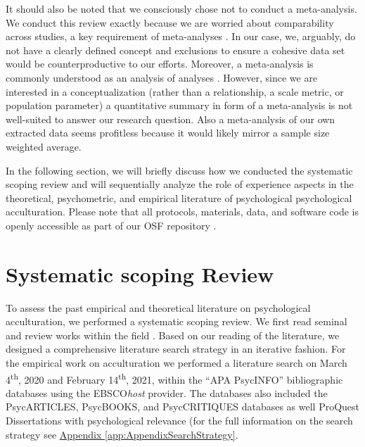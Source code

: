 \documentclass[man, 12pt, a4paper, mask]{apa7}
\providecommand{\DIFaddbegin}{} %
\providecommand{\DIFaddend}{} %
\newcommand{\DIFaddincludegraphics}[2][]{{\color{blue}\fbox{\DIFOincludegraphics[#1]{#2}}}} %
\DeclareRobustCommand{\DIFaddbegin}{\DIFOaddbegin \let\includegraphics\DIFaddincludegraphics} %
\DeclareRobustCommand{\DIFaddend}{\DIFOaddend \let\includegraphics\DIFOincludegraphics} %
\begin{document}
It should also be noted that we consciously chose not to conduct a meta-analysis. We conduct this review exactly because we are worried about comparability across studies, a key requirement of meta-analyses \citep{Pogue1998}. In our case, we, arguably, do not have a clearly defined concept and exclusions to ensure a cohesive data set would be counterproductive to our efforts. Moreover, a meta-analysis is commonly understood as an analysis of analyses \citep{Glass1976}. However, since we are interested in a conceptualization (rather than a relationship, a scale metric, or population parameter) a quantitative summary in form of a meta-analysis is not well-suited to answer our research question. Also a meta-analysis of our own extracted data seems profitless because it would likely mirror a sample size weighted average.

In the following section, we will briefly discuss how we conducted the systematic scoping review and will sequentially analyze the role of experience aspects in the theoretical, psychometric, and empirical literature of psychological psychological acculturation. Please note that all protocols, materials, data, and software code is openly accessible as part of our OSF repository \citep[][]{Kreienkamp2021e}.


\section{Systematic scoping Review}
\newcommand{\nTheo}{92}
\newcommand{\nMeth}{233}
\newcommand{\nEmp}{526}
\DIFaddbegin \newcommand{\nCultureHost}{43}
\newcommand{\nCultureOrigin}{118}
\newcommand{\nCultureCombs}{315}
\DIFaddend 

To assess the past empirical and theoretical literature on psychological
acculturation, we performed a systematic scoping review. We first read
seminal and review works within the field
\citep[including,][]{Ward2019, Berry1997b, Berry2003, Szapocznik1978, Sam2006a, Rudmin2003a}.
Based on our reading of the literature, we designed a comprehensive
literature search strategy in an iterative fashion. For the empirical
work on acculturation we performed a literature search on March
4\textsuperscript{th}, 2020 and February 14\textsuperscript{th}, 2021,
within the ``APA PsycINFO'' bibliographic databases using the
EBSCO\textit{host} provider. The databases also included the
PsycARTICLES, PsycBOOKS, and PsycCRITIQUES databases as well ProQuest
Dissertations with psychological relevance (for the full information on
the search strategy see
\hyperref[app:AppendixSearchStrategy]{Appendix \ref*{app:AppendixSearchStrategy}}.
\end{document}
